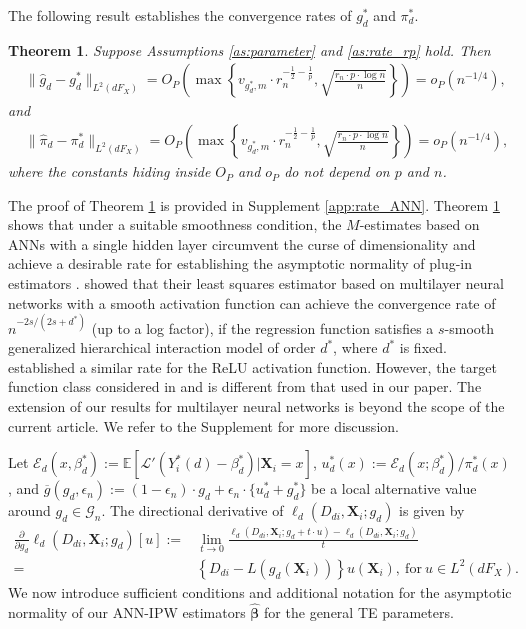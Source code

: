 \documentclass[11pt]{article}
\newtheorem{thm}{Theorem}
\numberwithin{equation}{section}
\begin{document}
The following result establishes the convergence rates of ${g}^*_d$ and ${\pi}^*_d$.
\begin{thm}\label{thm:rate_ANN} Suppose   Assumptions \ref{as:parameter} and \ref{as:rate_rp}   hold. Then
	\begin{align*}
		&\|\widehat{g}_d-g_d^*\|_{L^2(dF_X)}=O_P\left(\max\left\{v_{g_d^*,m}\cdot r_n^{-\frac{1}{2}-\frac{1}{p}},\sqrt{\frac{r_n\cdot p\cdot \log n}{n}}\right\}\right)=o_P\left(n^{-1/4}\right),
	\end{align*}
	and	
	\begin{align*}
		&\|\widehat{\pi}_d-\pi_d^*\|_{L^2(dF_X)}=O_P\left(\max\left\{v_{g_d^*,m}\cdot r_n^{-\frac{1}{2}-\frac{1}{p}},\sqrt{\frac{r_n\cdot p\cdot \log n}{n}}\right\}\right)=o_P\left(n^{-1/4}\right),
	\end{align*}
	where the constants hiding inside $O_P$ and $o_P$ do not depend on
	$p$ and $n$.	
\end{thm}




The proof of Theorem \ref{thm:rate_ANN} is provided in Supplement \ref{app:rate_ANN}. Theorem \ref{thm:rate_ANN} shows that under a suitable smoothness condition, the $M$-estimates based on ANNs with a single hidden layer circumvent the curse of dimensionality and achieve a desirable rate for establishing the asymptotic normality of plug-in estimators \citep{chen2003estimation}.   \cite{bauer2019deep} showed that their least squares estimator based on multilayer neural networks with a smooth activation function can achieve the convergence rate of $n^{-2s /(2s +d^{\ast })}$ (up to a log factor), if
the regression function satisfies a $s$-smooth generalized hierarchical
interaction model of order $d^{\ast }$, where $d^{\ast }$ is fixed. \cite{Schmidt2020} established a similar rate for the ReLU activation function.  However,  the target function class considered in \cite{bauer2019deep} and \cite{Schmidt2020} is different from that used in our paper. The extension of our results  for multilayer neural networks is beyond the scope of the current article.  We refer to the Supplement for more discussion.

Let $\mathcal{E}_d(x,\beta_d^*):=\mathbb{E}[\mathcal{L}'(Y_i^*(d)-{\beta}^*_d)|\boldsymbol{X}_{i}=x]$, $u_d^*(x):=\mathcal{E}_d(x;\beta_d^*)/\pi_d^*(x)$, and
$\overline{g}(g_d,\epsilon_n):=(1-\epsilon_n)\cdot g_d+\epsilon_n\cdot \{u_d^*+g_d^*\}$ be a local alternative value around $g_d\in\mathcal{G}_n$. The directional derivative of $\ell_d(D_{di},\boldsymbol{X}_{i};g_d)$ is given by \begin{align*}
	\frac{\partial}{\partial g_d}\ell_d(D_{di},\boldsymbol{X}_{i};g_d)[u]:=&\lim_{t\to 0}\frac{\ell_d(D_{di},\boldsymbol{X}_{i};g_d+t\cdot u)-\ell_d(D_{di},\boldsymbol{X}_{i};g_d)}{t}\\
	=&\left\{D_{di}-L(g_d(\boldsymbol{X}_i))\right\} u(\boldsymbol{X}_{i}), \ \text{for}\ u\in L^2(dF_X).
\end{align*}
We now introduce sufficient conditions and additional notation for the asymptotic normality of our ANN-IPW estimators $\widehat{\boldsymbol{\beta}}$ for the general TE parameters.
\end{document}
